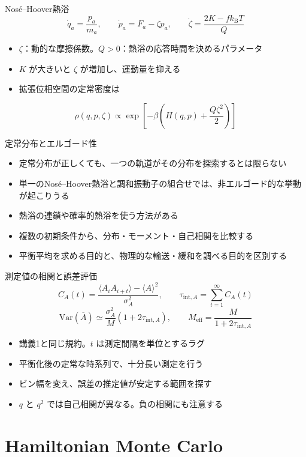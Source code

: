 \documentclass[10pt,aspectratio=169]{beamer}
\begin{document}
\begin{frame}{Nosé--Hoover熱浴}
\[
\dot q_a=\frac{p_a}{m_a},\qquad
\dot p_a=F_a-\zeta p_a,\qquad
\dot\zeta=\frac{2K-f k_{\mathrm B}T}{Q}
\]
\begin{itemize}
\item $\zeta$：動的な摩擦係数。$Q>0$：熱浴の応答時間を決めるパラメータ
\item $K$ が大きいと $\zeta$ が増加し、運動量を抑える
\item 拡張位相空間の定常密度は
\end{itemize}
\[
\rho(q,p,\zeta)\propto
\exp\left[-\beta\left(H(q,p)+\frac{Q\zeta^2}{2}\right)\right]
\]
\end{frame}

\begin{frame}{定常分布とエルゴード性}
\begin{itemize}
\item 定常分布が正しくても、一つの軌道がその分布を探索するとは限らない
\item 単一のNosé--Hoover熱浴と調和振動子の組合せでは、非エルゴード的な挙動が起こりうる
\item 熱浴の連鎖や確率的熱浴を使う方法がある
\item 複数の初期条件から、分布・モーメント・自己相関を比較する
\item 平衡平均を求める目的と、物理的な輸送・緩和を調べる目的を区別する
\end{itemize}
\end{frame}

\begin{frame}{測定値の相関と誤差評価}
\[
C_A(t)=\frac{\langle A_i A_{i+t}\rangle-\langle A\rangle^2}{\sigma_A^2},
\qquad \tau_{\mathrm{int},A}=\sum_{t=1}^{\infty}C_A(t)
\]
\[
\mathrm{Var}(\overline A)\simeq
\frac{\sigma_A^2}{M}(1+2\tau_{\mathrm{int},A}),\qquad
M_{\mathrm{eff}}=\frac{M}{1+2\tau_{\mathrm{int},A}}
\]
\begin{itemize}
\item 講義1と同じ規約。$t$ は測定間隔を単位とするラグ
\item 平衡化後の定常な時系列で、十分長い測定を行う
\item ビン幅を変え、誤差の推定値が安定する範囲を探す
\item $q$ と $q^2$ では自己相関が異なる。負の相関にも注意する
\end{itemize}
\end{frame}

\section{Hamiltonian Monte Carlo}
\end{document}
